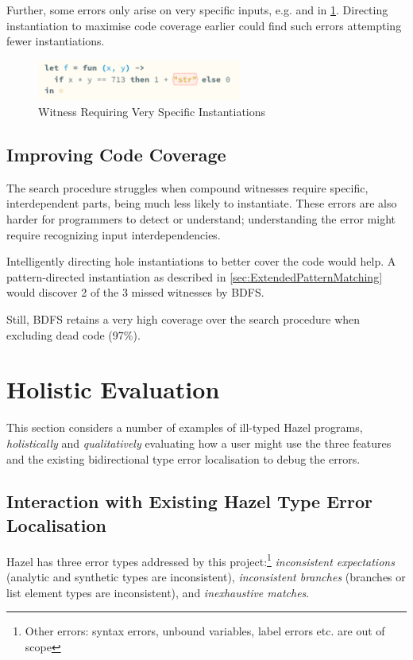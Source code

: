 Further, some errors only arise on very specific inputs, e.g.  and  in \cref{fig:SpecificInstantiations}. Directing instantiation to maximise code coverage earlier could find such errors attempting fewer instantiations.
\begin{figure}\centering
\includegraphics[width=0.6\textwidth]{Media/Figures/very_specific_error}
\caption{Witness Requiring Very Specific Instantiations}
\label{fig:SpecificInstantiations}
\end{figure}

\subsection{Improving Code Coverage}
\label{sec:EvalHoleInstantiation}
The search procedure struggles when compound witnesses require specific, interdependent parts, being much less likely to instantiate. These errors are also harder for programmers to detect or understand; understanding the error might require recognizing input interdependencies.

Intelligently directing hole instantiations to better cover the code would help. A pattern-directed instantiation as described in \cref{sec:ExtendedPatternMatching} would discover 2 of the 3 missed witnesses by BDFS.

Still, BDFS retains a very high coverage over the search procedure when excluding dead code (97\%).

\section{Holistic Evaluation}
\label{sec:HolisticEvaluation}

This section considers a number of examples of ill-typed Hazel programs, \textit{holistically} and \textit{qualitatively} evaluating how a user might use the three features and the existing bidirectional type error localisation \cite{MarkedLocalisation} to debug the errors. 


\subsection{Interaction with Existing Hazel Type Error Localisation}
Hazel has three error types addressed by this project:\footnote{Other errors: syntax errors, unbound variables, label errors etc. are out of scope} \textit{inconsistent expectations} (analytic and synthetic types are inconsistent), \textit{inconsistent branches }(branches or list element types are inconsistent), and \textit{inexhaustive matches}. 

